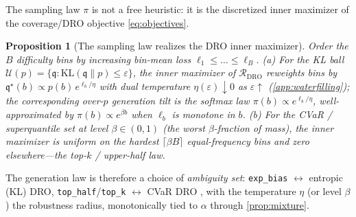 \documentclass{article}
\theoremstyle{plain}
\newtheorem{proposition}{Proposition}
\theoremstyle{definition}
\theoremstyle{remark}
\newcommand{\pnat}{p}
\newcommand{\Rdro}{\mathcal{R}_{\mathrm{DRO}}}
\newcommand{\unif}{\alpha}
\begin{document}
The sampling law $\pi$ is not a free heuristic: it is the discretized inner maximizer of the
coverage/DRO objective \eqref{eq:objectives}.
\begin{proposition}[The sampling law realizes the DRO inner maximizer]\label{prop:samplinglaw}
Order the $B$ difficulty bins by increasing bin-mean loss $\ell_1\le\dots\le\ell_B$.
\emph{(a)} For the KL ball $\mathcal U(\pnat)=\{\mathfrak q:\mathrm{KL}(\mathfrak q\|\pnat)\le\varepsilon\}$,
the inner maximizer of $\Rdro$ reweights bins by $\mathfrak q^\star(b)\propto\pnat(b)\,e^{\ell_b/\eta}$
with dual temperature $\eta(\varepsilon)\!\downarrow\!0$ as $\varepsilon\!\uparrow$
(\cref{app:waterfilling}); the corresponding over-$\pnat$ generation tilt is the softmax law
$\pi(b)\propto e^{\ell_b/\eta}$, well-approximated by $\pi(b)\propto e^{\beta b}$ when $\ell_b$ is monotone
in $b$. \emph{(b)} For the CVaR / superquantile set at level $\beta\in(0,1)$ (the worst $\beta$-fraction of
mass), the inner maximizer is uniform on the hardest $\lceil\beta B\rceil$ equal-frequency bins and zero
elsewhere---the top-$k$ / upper-half law.
\end{proposition}
The generation law is therefore a choice of \emph{ambiguity set}: \texttt{exp\_bias} $\leftrightarrow$
entropic (KL) DRO, \texttt{top\_half}/\texttt{top\_k} $\leftrightarrow$ CVaR DRO
\citep{benTal2013dro,rockafellar2000cvar,duchi2021dro,sagawa2020groupdro}, with the temperature $\eta$ (or
level $\beta$) the robustness radius, monotonically tied to $\unif$ through \cref{prop:mixture}.
\end{document}

